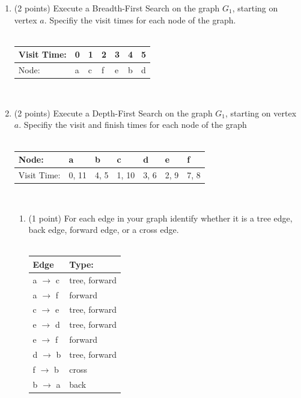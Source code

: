 \documentclass[12pt]{elsart}
\begin{document}
   \begin{enumerate}
      \item (2 points) Execute a Breadth-First Search on the graph $G_1$, starting on vertex $a$. Specifiy the visit times for each node of the graph.\\\\
\hspace*{0.5cm}  \begin{tabular}{ |l|l|l|l|l|l|l| }
  \hline
   Visit Time: & 0 & 1 & 2 & 3 & 4 & 5 \\
  \hline
  Node: & a & c & f & e & b & d \\
  \hline 
\end{tabular}\\
      \item (2 points) Execute a Depth-First Search on the graph $G_1$, starting on vertex $a$. Specifiy the visit and finish times for each node of the graph\\\\
\hspace*{0.5cm}  \begin{tabular}{ |l|l|l|l|l|l|l| }
  \hline
   Node: & a & b & c & d & e & f \\
  \hline
   Visit Time: & 0, 11 & 4, 5 & 1, 10 & 3, 6 & 2, 9 & 7, 8 \\
  \hline 
\end{tabular}\\
   \begin{enumerate}
      \item (1 point) For each edge in your graph identify whether it is a tree edge, back edge, forward edge, or a cross edge.\\\\
  \hspace*{0.5cm}  \begin{tabular}{ |l|l|}
  \hline
   {\bf Edge} & {\bf Type:}  \\
  \hline
   a $\rightarrow$ c & tree, forward \\
  \hline 
   a $\rightarrow$ f & forward \\
\hline
c $\rightarrow$ e & tree, forward \\
\hline
e $\rightarrow$ d & tree, forward \\
\hline
e $\rightarrow$ f & forward \\
\hline
d $\rightarrow$ b & tree, forward \\
\hline
f $\rightarrow$ b & cross \\
\hline
b $\rightarrow$ a & back \\

\end{tabular}
\end{enumerate}
\end{enumerate}
\end{document}
